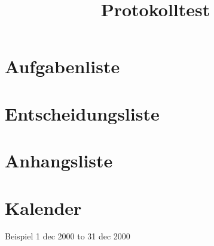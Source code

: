 \documentclass[ngerman]{scrartcl}
\title{Protokolltest}
\begin{document}
	\maketitle
	\tableofcontents
	
	\section*{Aufgabenliste}
	\listoftasks
	
	\section*{Entscheidungsliste}
	\listofdecisions
	
	\section*{Anhangsliste}
	\listofattachments
	
	\section*{Kalender}
	\prepareCal
	\begin{eventlist}{}{Beispiel}
		1 dec 2000 to 31 dec 2000
	\end{eventlist}
	
\end{document}
